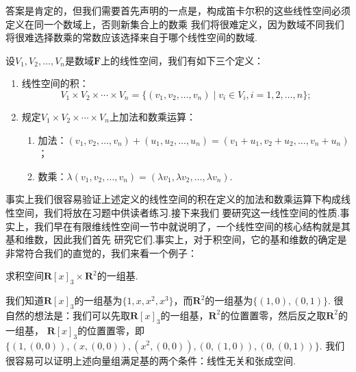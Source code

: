 答案是肯定的，但我们需要首先声明的一点是，构成笛卡尔积的这些线性空间必须定义在同一个数域上，否则新集合上的数乘
我们将很难定义，因为数域不同我们将很难选择数乘的常数应该选择来自于哪个线性空间的数域.
\begin{definition}\label{def:8:积空间}
    设$V_1,V_2,\ldots,V_n$是数域$\mathbf{F}$上的线性空间，我们有如下三个定义：
    \begin{enumerate}
        \item 线性空间的积：
        \[V_1 \times V_2 \times \cdots \times V_n=\{(v_1,v_2,\ldots,v_n)\mid v_i \in V_i,i=1,2,\ldots,n\};\]
        
        \item 规定$V_1 \times V_2 \times \cdots \times V_n$上加法和数乘运算：
        \begin{enumerate}
            \item 加法：$(v_1,v_2,\ldots,v_n)+(u_1,u_2,\ldots,u_n)=(v_1+u_1,v_2+u_2,\ldots,v_n+u_n)$；
            \item 数乘：$\lambda(v_1,v_2,\ldots,v_n)=(\lambda v_1,\lambda v_2,\ldots,\lambda v_n)$.
        \end{enumerate}
    \end{enumerate}
\end{definition}

事实上我们很容易验证上述定义的线性空间的积在定义的加法和数乘运算下构成线性空间，我们将放在习题中供读者练习.接下来我们
要研究这一线性空间的性质.事实上，我们早在有限维线性空间一节中就说明了，一个线性空间的核心结构就是其基和维数，因此我们首先
研究它们.事实上，对于积空间，它的基和维数的确定是非常符合我们的直觉的，我们来看一个例子：
\begin{example}
    求积空间$\mathbf{R}[x]_3\times\mathbf{R}^2$的一组基.
\end{example}

\begin{solution}
    我们知道$\mathbf{R}[x]_3$的一组基为$\{1,x,x^2,x^3\}$，而$\mathbf{R}^2$的一组基为$\{(1,0),(0,1)\}$.
    很自然的想法是：我们可以先取$\mathbf{R}[x]_3$的一组基，$\mathbf{R}^2$的位置置零，然后反之取$\mathbf{R}^2$的一组基，
    $\mathbf{R}[x]_3$的位置置零，即$\{(1,(0,0)),(x,(0,0)),(x^2,(0,0)),(0,(1,0)),(0,(0,1))\}$.
    我们很容易可以证明上述向量组满足基的两个条件：线性无关和张成空间.
\end{solution}

